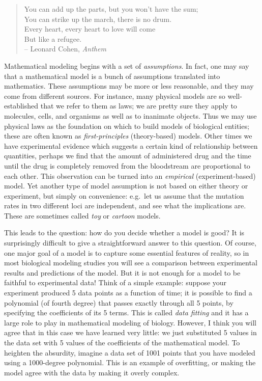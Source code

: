 \documentclass[
]{book}
\theoremstyle{definition}
\theoremstyle{definition}
\theoremstyle{definition}
\theoremstyle{remark}
\begin{document}
\begin{quote}
You can add up the parts, but you won't have the sum;\\
You can strike up the march, there is no drum.\\
Every heart, every heart to love will come\\
But like a refugee.\\
-- Leonard Cohen, \emph{Anthem}
\end{quote}

Mathematical modeling begins with a set of \emph{assumptions}. In fact, one may say that a mathematical model is a bunch of assumptions translated into mathematics. These assumptions may be more or less reasonable, and they may come from different sources. For instance, many physical models are so well-established that we refer to them as laws; we are pretty sure they apply to molecules, cells, and organisms as well as to inanimate objects. Thus we may use physical laws as the foundation on which to build models of biological entities; these are often known as \emph{first-principles} (theory-based) models. Other times we have experimental evidence which suggests a certain kind of relationship between quantities, perhaps we find that the amount of administered drug and the time until the drug is completely removed from the bloodstream are proportional to each other. This observation can be turned into an \emph{empirical} (experiment-based) model. Yet another type of model assumption is not based on either theory or experiment, but simply on convenience: e.g.~let us assume that the mutation rates in two different loci are independent, and see what the implications are. These are sometimes called \emph{toy} or \emph{cartoon} models. \citep{jungck_mathematical_2010}

This leads to the question: how do you decide whether a model is good? It is surprisingly difficult to give a straightforward answer to this question. Of course, one major goal of a model is to capture some essential features of reality, so in most biological modeling studies you will see a comparison between experimental results and predictions of the model. But it is not enough for a model to be faithful to experimental data! Think of a simple example: suppose your experiment produced 5 data points as a function of time; it is possible to find a polynomial (of fourth degree) that passes exactly through all 5 points, by specifying the coefficients of its 5 terms. This is called  \emph{data fitting} and it has a large role to play in mathematical modeling of biology. However, I think you will agree that in this case we have learned very little: we just substituted 5 values in the data set with 5 values of the coefficients of the mathematical model. To heighten the absurdity, imagine a data set of 1001 points that you have modeled using a 1000-degree polynomial. This is an example of overfitting, or making the model agree with the data by making it overly complex.
\end{document}
